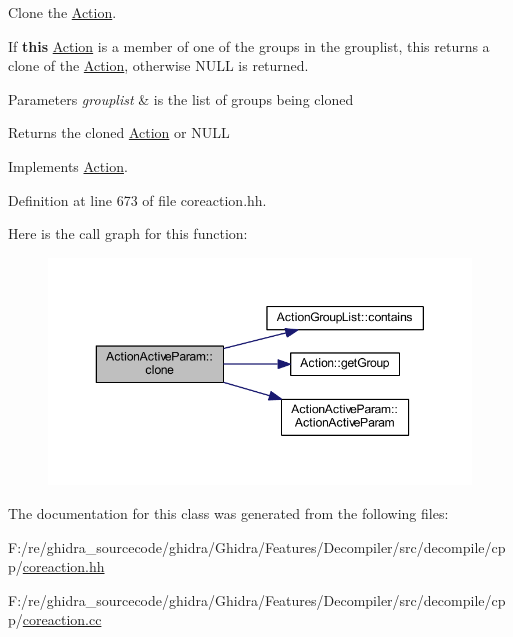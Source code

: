 Clone the \mbox{\hyperlink{class_action}{Action}}. 

If {\bfseries{this}} \mbox{\hyperlink{class_action}{Action}} is a member of one of the groups in the grouplist, this returns a clone of the \mbox{\hyperlink{class_action}{Action}}, otherwise N\+U\+LL is returned. 
\begin{DoxyParams}{Parameters}
{\em grouplist} & is the list of groups being cloned \\
\hline
\end{DoxyParams}
\begin{DoxyReturn}{Returns}
the cloned \mbox{\hyperlink{class_action}{Action}} or N\+U\+LL 
\end{DoxyReturn}


Implements \mbox{\hyperlink{class_action_af8242e41d09e5df52f97df9e65cc626f}{Action}}.



Definition at line 673 of file coreaction.\+hh.

Here is the call graph for this function\+:
\nopagebreak
\begin{figure}[H]
\begin{center}
\leavevmode
\includegraphics[width=350pt]{class_action_active_param_ae7135b6adc5448d7d03d4280bc12d610_cgraph}
\end{center}
\end{figure}


The documentation for this class was generated from the following files\+:\begin{DoxyCompactItemize}
\item 
F\+:/re/ghidra\+\_\+sourcecode/ghidra/\+Ghidra/\+Features/\+Decompiler/src/decompile/cpp/\mbox{\hyperlink{coreaction_8hh}{coreaction.\+hh}}\item 
F\+:/re/ghidra\+\_\+sourcecode/ghidra/\+Ghidra/\+Features/\+Decompiler/src/decompile/cpp/\mbox{\hyperlink{coreaction_8cc}{coreaction.\+cc}}\end{DoxyCompactItemize}
